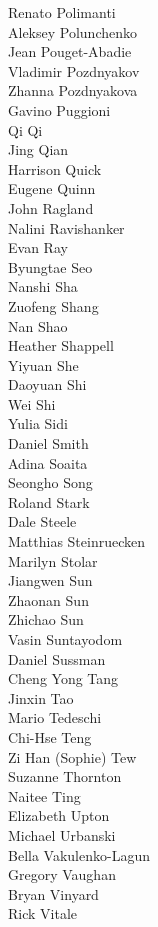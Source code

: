 Renato Polimanti\\
Aleksey Polunchenko\\
Jean Pouget-Abadie\\
Vladimir Pozdnyakov\\
Zhanna Pozdnyakova\\
Gavino Puggioni\\
Qi Qi\\
Jing Qian\\
Harrison  Quick\\
Eugene Quinn\\
John Ragland\\
Nalini Ravishanker\\
Evan Ray\\
Byungtae Seo\\
Nanshi Sha\\
Zuofeng Shang\\
Nan Shao\\
Heather Shappell\\
Yiyuan She\\
Daoyuan Shi\\
Wei Shi\\
Yulia Sidi\\
Daniel Smith\\
Adina Soaita\\
Seongho Song\\
Roland Stark\\
Dale Steele\\
Matthias Steinruecken\\
Marilyn Stolar\\
Jiangwen Sun\\
Zhaonan Sun\\
Zhichao Sun\\
Vasin  Suntayodom\\
Daniel Sussman\\
Cheng Yong Tang\\
Jinxin Tao\\
Mario  Tedeschi\\
Chi-Hse Teng\\
Zi Han (Sophie) Tew\\
Suzanne Thornton\\
Naitee Ting\\
Elizabeth Upton\\
Michael Urbanski\\
Bella Vakulenko-Lagun\\
Gregory Vaughan\\
Bryan Vinyard\\
Rick Vitale\\
